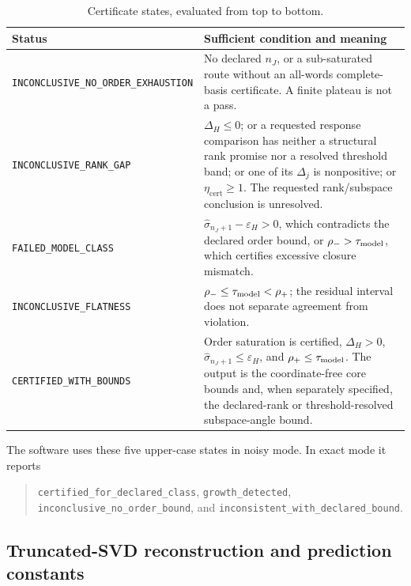 \documentclass[aps,prl,reprint,superscriptaddress,nofootinbib]{revtex4-2}
\newcommand{\cert}{\mathrm{cert}}
\newcommand{\eps}{\varepsilon}
\begin{document}
\begin{table}[t]
\caption{Certificate states, evaluated from top to bottom.}
\label{tab:status}
\begin{tabular}{@{}ll@{}}
\toprule
\parbox[t]{0.29\linewidth}{Status} &
\parbox[t]{0.63\linewidth}{Sufficient condition and meaning}\\
\midrule
\parbox[t]{0.29\linewidth}{\texttt{INCONCLUSIVE\_NO\_ORDER\_EXHAUSTION}} &
\parbox[t]{0.63\linewidth}{No declared $n_J$, or a sub-saturated route without an all-words complete-basis certificate.  A finite plateau is not a pass.}\\[3pt]
\parbox[t]{0.29\linewidth}{\texttt{INCONCLUSIVE\_RANK\_GAP}} &
\parbox[t]{0.63\linewidth}{$\Delta_H\le0$; or a requested response comparison has neither a structural rank promise nor a resolved threshold band; or one of its $\Delta_j$ is nonpositive; or $\eta_{\cert}\ge1$.  The requested rank/subspace conclusion is unresolved.}\\[3pt]
\parbox[t]{0.29\linewidth}{\texttt{FAILED\_MODEL\_CLASS}} &
\parbox[t]{0.63\linewidth}{$\widehat\sigma_{n_J+1}-\eps_H>0$, which contradicts the declared order bound, or $\rho_->\tau_{\rm model}$, which certifies excessive closure mismatch.}\\[3pt]
\parbox[t]{0.29\linewidth}{\texttt{INCONCLUSIVE\_FLATNESS}} &
\parbox[t]{0.63\linewidth}{$\rho_-\le\tau_{\rm model}<\rho_+$; the residual interval does not separate agreement from violation.}\\[3pt]
\parbox[t]{0.29\linewidth}{\texttt{CERTIFIED\_WITH\_BOUNDS}} &
\parbox[t]{0.63\linewidth}{Order saturation is certified, $\Delta_H>0$, $\widehat\sigma_{n_J+1}\le\eps_H$, and $\rho_+\le\tau_{\rm model}$.  The output is the coordinate-free core bounds and, when separately specified, the declared-rank or threshold-resolved subspace-angle bound.}\\
\bottomrule
\end{tabular}
\end{table}

The software uses these five upper-case states in noisy mode.  In exact mode it reports
\begin{quote}\small\raggedright
\texttt{certified\_for\_declared\_class},
\texttt{growth\_detected},
\texttt{inconclusive\_no\_order\_bound}, and
\texttt{inconsistent\_with\_declared\_bound}.
\end{quote}

\subsection{Truncated-SVD reconstruction and prediction constants}
\label{sec:truncated-reconstruction}
\end{document}
